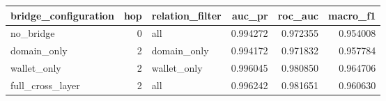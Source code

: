 \begin{tabular}{lrlrrr}
\toprule
bridge_configuration & hop & relation_filter & auc_pr & roc_auc & macro_f1 \\
\midrule
no_bridge & 0 & all & 0.994272 & 0.972355 & 0.954008 \\
domain_only & 2 & domain_only & 0.994172 & 0.971832 & 0.957784 \\
wallet_only & 2 & wallet_only & 0.996045 & 0.980850 & 0.964706 \\
full_cross_layer & 2 & all & 0.996242 & 0.981651 & 0.960630 \\
\bottomrule
\end{tabular}
